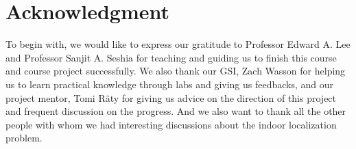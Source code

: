 \documentclass[conference, 10pt]{IEEEtran}
\begin{document}


\section*{Acknowledgment}
To begin with, we would like to express our gratitude to Professor Edward A. Lee and Professor Sanjit A. Seshia for teaching and guiding us to finish this course and course project successfully. We also thank our GSI, Zach Wasson for helping us to learn practical knowledge through labs and giving us feedbacks, and our project mentor, Tomi R{\"a}ty for giving us advice on the direction of this project and frequent discussion on the progress. And we also want to thank all the other people with whom we had interesting discussions about the indoor localization problem.



%
%
%



\end{document}
